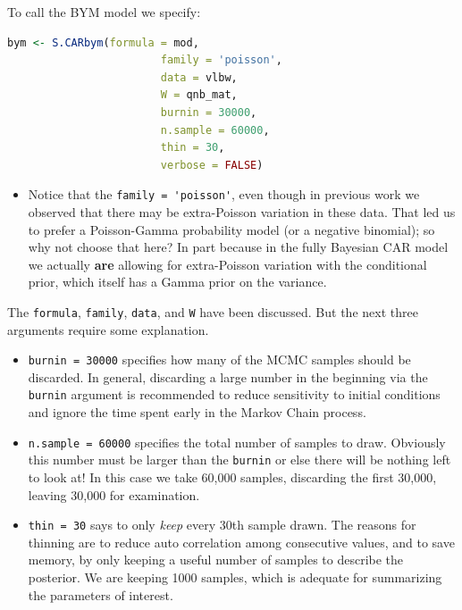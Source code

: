 \documentclass[
]{book}
\newcommand{\passthrough}[1]{#1}
\providecommand{\tightlist}{%
  \setlength{\itemsep}{0pt}\setlength{\parskip}{0pt}}
\newenvironment{rmdblock}[1]
  {%
  \begin{itemize}
  \renewcommand{\labelitemi}{
    \raisebox{-.7\height}[0pt][0pt]{
      {\setkeys{Gin}{width=3em,keepaspectratio}\texttt{[image: images/\#1]}}
    }
  }
  \item
  }
  {
  \end{itemize}
  }
\newenvironment{rmdnote}
  {\begin{rmdblock}{note}}
  {\end{rmdblock}}
\begin{document}
To call the BYM model we specify:

\begin{lstlisting}[language=R]
bym <- S.CARbym(formula = mod, 
                        family = 'poisson', 
                        data = vlbw, 
                        W = qnb_mat,
                        burnin = 30000, 
                        n.sample = 60000, 
                        thin = 30,
                        verbose = FALSE)
\end{lstlisting}

\begin{rmdnote}
Notice that the \passthrough{\lstinline!family = 'poisson'!}, even though in previous work we observed that there may be extra-Poisson variation in these data. That led us to prefer a Poisson-Gamma probability model (or a negative binomial); so why not choose that here? In part because in the fully Bayesian CAR model we actually \textbf{are} allowing for extra-Poisson variation with the conditional prior, which itself has a Gamma prior on the variance.
\end{rmdnote}

The \passthrough{\lstinline!formula!}, \passthrough{\lstinline!family!}, \passthrough{\lstinline!data!}, and \passthrough{\lstinline!W!} have been discussed. But the next three arguments require some explanation.

\begin{itemize}
\tightlist
\item
  \passthrough{\lstinline!burnin = 30000!} specifies how many of the MCMC samples should be discarded. In general, discarding a large number in the beginning via the \passthrough{\lstinline!burnin!} argument is recommended to reduce sensitivity to initial conditions and ignore the time spent early in the Markov Chain process.
\item
  \passthrough{\lstinline!n.sample = 60000!} specifies the total number of samples to draw. Obviously this number must be larger than the \passthrough{\lstinline!burnin!} or else there will be nothing left to look at! In this case we take 60,000 samples, discarding the first 30,000, leaving 30,000 for examination.
\item
  \passthrough{\lstinline!thin = 30!} says to only \emph{keep} every 30th sample drawn. The reasons for thinning are to reduce auto correlation among consecutive values, and to save memory, by only keeping a useful number of samples to describe the posterior. We are keeping 1000 samples, which is adequate for summarizing the parameters of interest.
\end{itemize}
\end{document}
